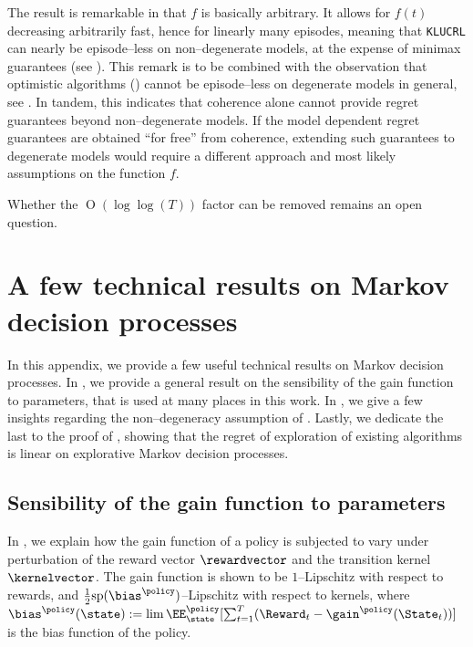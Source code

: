\documentclass[preprint,cleveref,12pt]{colt2025}
\DeclarePairedDelimiter{\parens}{(}{)}	%
\newcommand{\vecspan}[1]{\mathrm{sp}\parens{#1}}
\DeclareMathOperator*{\OH}{\mathrm{O}}
\def\kernel{\kernelvector}
\def\reward{\rewardvector}
\begin{document}
    The result is remarkable in that $f$ is basically arbitrary.
    It allows for $f(t)$ decreasing arbitrarily fast, hence for linearly many episodes, meaning that \texttt{KLUCRL} can nearly be episode--less on non--degenerate models, at the expense of minimax guarantees (see ). 
    This remark is to be combined with the observation that optimistic algorithms () cannot be episode--less on degenerate models in general, see \cite{ortner_online_2010}.
    In tandem, this indicates that coherence alone cannot provide regret guarantees beyond non--degenerate models. 
    If the model dependent regret guarantees are obtained ``for free'' from coherence, extending such guarantees to degenerate models would require a different approach and most likely assumptions on the function $f$. 

    Whether the $\OH(\log\log(T))$ factor can be removed remains an open question. 

    \clearpage
    \section{A few technical results on Markov decision processes}
    \label{appendix_technical}

    In this appendix, we provide a few useful technical results on Markov decision processes.
    In , we provide a general result on the sensibility of the gain function to parameters, that is used at many places in this work. 
    In , we give a few insights regarding the non--degeneracy assumption of .
    Lastly, we dedicate the last  to the proof of , showing that the regret of exploration of existing algorithms is linear on explorative Markov decision processes. 

    \subsection{Sensibility of the gain function to parameters}
    \label{appendix_gain_function}

    In , we explain how the gain function of a policy is subjected to vary under perturbation of the reward vector $\reward$ and the transition kernel $\kernel$. 
    The gain function is shown to be $1$--Lipschitz with respect to rewards, and $\frac 12 \vecspan{\bias^\policy}$--Lipschitz with respect to kernels, where $\bias^\policy (\state) := \lim \EE_{\state}^\policy [\sum_{t=1}^T (\Reward_t - \gain^\policy(\State_t))]$ is the bias function of the policy. 
\end{document}
